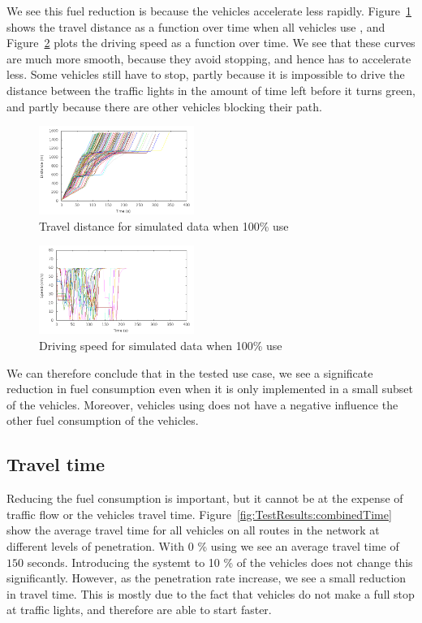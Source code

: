 We see this fuel reduction is because the vehicles accelerate less rapidly. 
Figure~\ref{fig:TestResults:distance100} shows the travel distance as a function over time when all vehicles use \tech, and Figure~\ref{fig:TestResults:speed100} plots the driving speed as a function over time.
We see that these curves are much more smooth, because they avoid stopping, and hence has to accelerate less.
Some vehicles still have to stop, partly because it is impossible to drive the distance between the traffic lights in the amount of time left before it turns green, and partly because there are other vehicles blocking their path.
\begin{figure}[htb]
\includegraphics[width=0.45\textwidth]{../images/tp0c1_0/distanceControlled100.png}
\caption{Travel distance for simulated data when 100\% use \tech}
\label{fig:TestResults:distance100}
\end{figure}

\begin{figure}[htb]
\includegraphics[width=0.45\textwidth]{../images/tp0c1_0/speedControlled100.png}
\caption{Driving speed for simulated data when 100\% use \tech}
\label{fig:TestResults:speed100}
\end{figure}

We can therefore conclude that in the tested use case, we see a significate reduction in fuel consumption even when it is only implemented in a small subset of the vehicles. 
Moreover, vehicles using \tech does not have a negative influence the other fuel consumption of the vehicles.

\subsection{Travel time}
Reducing the fuel consumption is important, but it cannot be at the expense of traffic flow or the vehicles travel time.
Figure~\ref{fig:TestResults:combinedTime} show the average travel time for all vehicles on all routes in the network at different levels of penetration.
With 0 \% using \tech we see an average travel time of $150$ seconds. 
Introducing the systemt to 10 \% of the vehicles does not change this significantly. 
However, as the penetration rate increase, we see a small reduction in travel time. 
This is mostly due to the fact that vehicles do not make a full stop at traffic lights, and therefore are able to start faster.

